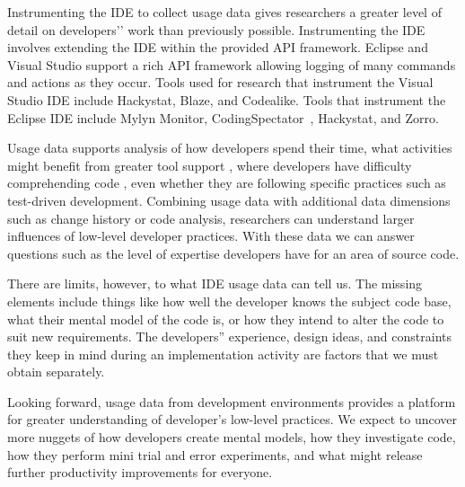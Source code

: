 Instrumenting the IDE to collect usage data gives researchers a greater level of detail on developers’' work than previously possible. Instrumenting the IDE involves extending the IDE within the provided API framework.  Eclipse and Visual Studio support a rich API framework allowing logging of many commands and actions  as they occur.  Tools used for research that instrument the Visual Studio IDE include Hackystat\cite{V:johnson2003beyond}, Blaze, and Codealike.  Tools that instrument the Eclipse IDE include Mylyn Monitor, CodingSpectator~\cite{VakilianETAL2012UseDisuseMisuse}, Hackystat\cite{V:johnson2003beyond}, and Zorro\cite{Kou2010Operational}.

Usage data supports analysis of how developers spend their time\cite{V:johnson2003beyond}, what activities might benefit from greater tool support \cite{V:MurphyHill2012How}, where developers have difficulty comprehending code \cite{Carter2010Are}, even whether they are following specific practices such as test-driven development\cite{Kou2010Operational}.  Combining usage data with additional data dimensions such as change history or code analysis, researchers can understand larger influences of low-level developer practices.  With these data we can answer questions such as the level of expertise developers have for an area of source code. \cite{Fritz2010Degreeofknowledge}

There are limits, however, to what IDE usage data can tell us.  The missing elements include things like how well the developer knows the subject code base, what their mental model of the code is, or how they intend to alter the code to suit new requirements.  The developers'' experience, design ideas, and constraints they keep in mind during an implementation activity are factors that we must obtain separately.  

Looking forward, usage data from development environments provides a platform for greater understanding of developer's low-level practices.  We expect to uncover more nuggets of how developers create mental models, how they investigate code, how they perform mini trial and error experiments, and what might release further productivity improvements for everyone.
